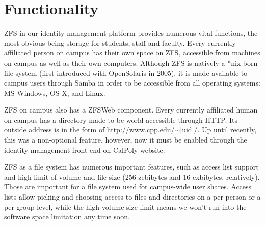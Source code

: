 \section{Functionality}
ZFS in our identity management platform provides numerous vital functions, the most obvious being storage for students, staff and faculty. Every currently affiliated person on campus has their own space on ZFS, accessible from machines on campus as well as their own computers. Although ZFS is natively a *nix-born file system (first introduced with OpenSolaris in 2005), it is made available to campus users through Samba in order to be accessible from all operating
systems: MS Windows, OS X, and Linux. 

ZFS on campus also has a ZFSWeb component. Every currently affiliated human on campus has a directory made to be world-accessible through HTTP. Its outside address is in the form of http://www.cpp.edu/$\sim$[uid]/. Up until recently, this was a non-optional feature, however, now it must be enabled through the identity management front-end on CalPoly website.

ZFS as a file system has numerous important features, such as access list support and high limit of volume and file size (256 zebibytes and 16 exbibytes, relatively). Those are important for a file system used for campus-wide user shares. Access lists allow picking and choosing access to files and directories on a per-person or a per-group level, while the high volume size limit means we won't run into the software space limitation any time soon. 
